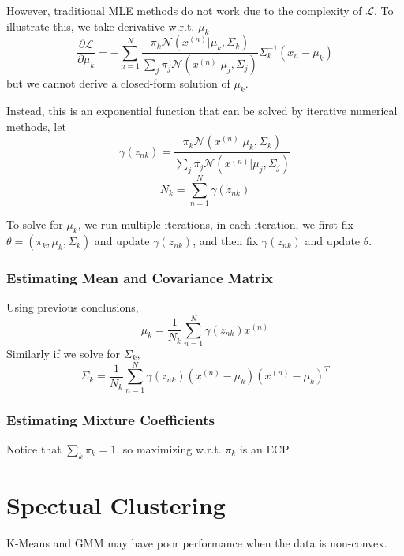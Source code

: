        However, traditional MLE methods do not work due to the complexity of $\mathcal{L}$. To illustrate this, we take derivative w.r.t. $\mu_k$
        \[ \frac{\partial \mathcal{L}}{\partial \mu_k} = -\sum_{n=1}^N\frac{\pi_k\mathcal{N}(x^{(n)}|\mu_k,\Sigma_k)}{\sum_j\pi_j\mathcal{N}(x^{(n)}|\mu_j,\Sigma_j)}\Sigma_k^{-1}(x_n-\mu_k) \]
        but we cannot derive a closed-form solution of $\mu_k$.

        Instead, this is an exponential function that can be solved by iterative numerical methods, let
        \[ \gamma(z_{nk}) = \frac{\pi_k\mathcal{N}(x^{(n)}|\mu_k,\Sigma_k)}{\sum_j\pi_j\mathcal{N}(x^{(n)}|\mu_j,\Sigma_j)} \]
        \[ N_k = \sum_{n=1}^N \gamma(z_{nk}) \]

        To solve for $\mu_k$, we run multiple iterations, in each iteration, we first fix $\theta = (\pi_k,\mu_k,\Sigma_k)$ and update $\gamma(z_{nk})$, and then fix $\gamma(z_{nk})$ and update $\theta$.

        \subsubsection{Estimating Mean and Covariance Matrix}
        Using previous conclusions,
        \[ \mu_k = \frac{1}{N_k}\sum_{n=1}^N\gamma(z_{nk})x^{(n)} \]
        Similarly if we solve for $\Sigma_k$,
        \[ \Sigma_k = \frac{1}{N_k}\sum_{n=1}^N\gamma(z_{nk})(x^{(n)}-\mu_k)(x^{(n)}-\mu_k)^T \]

        \subsubsection{Estimating Mixture Coefficients}
        Notice that $\sum_k\pi_k = 1$, so maximizing w.r.t. $\pi_k$ is an ECP.

    
\section{Spectual Clustering}
    K-Means and GMM may have poor performance when the data is non-convex.
